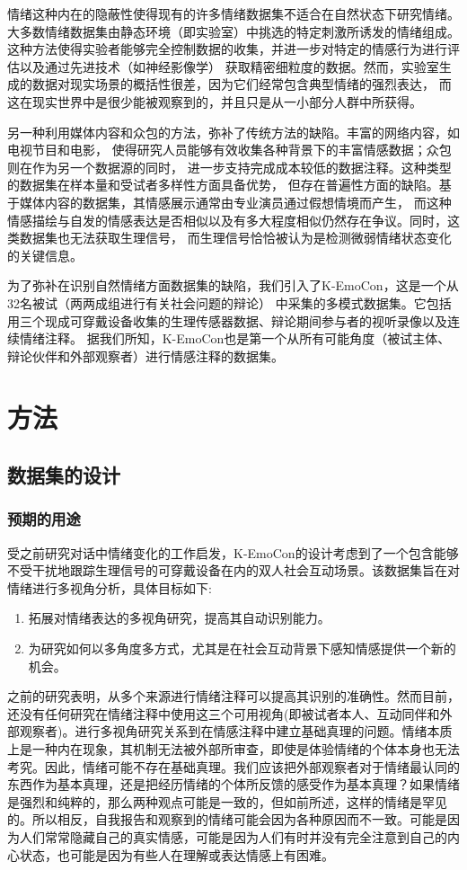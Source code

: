情绪这种内在的隐蔽性使得现有的许多情绪数据集不适合在自然状态下研究情绪。
大多数情绪数据集由静态环境（即实验室）中挑选的特定刺激所诱发的情绪组成。
这种方法使得实验者能够完全控制数据的收集，并进一步对特定的情感行为进行评估以及通过先进技术（如神经影像学）
获取精密细粒度的数据。然而，实验室生成的数据对现实场景的概括性很差，因为它们经常包含典型情绪的强烈表达，
而这在现实世界中是很少能被观察到的，并且只是从一小部分人群中所获得。

另一种利用媒体内容和众包的方法，弥补了传统方法的缺陷。丰富的网络内容，如电视节目和电影，
使得研究人员能够有效收集各种背景下的丰富情感数据；众包则在作为另一个数据源的同时，
进一步支持完成成本较低的数据注释。这种类型的数据集在样本量和受试者多样性方面具备优势，
但存在普遍性方面的缺陷。基于媒体内容的数据集，其情感展示通常由专业演员通过假想情境而产生，
而这种情感描绘与自发的情感表达是否相似以及有多大程度相似仍然存在争议。同时，这类数据集也无法获取生理信号，
而生理信号恰恰被认为是检测微弱情绪状态变化的关键信息。

为了弥补在识别自然情绪方面数据集的缺陷，我们引入了K-EmoCon，这是一个从32名被试（两两成组进行有关社会问题的辩论）
中采集的多模式数据集。它包括用三个现成可穿戴设备收集的生理传感器数据、辩论期间参与者的视听录像以及连续情绪注释。
据我们所知，K-EmoCon也是第一个从所有可能角度（被试主体、辩论伙伴和外部观察者）进行情感注释的数据集。

\section{方法}
\subsection{数据集的设计}
\subsubsection{预期的用途}
受之前研究对话中情绪变化的工作启发，K-EmoCon的设计考虑到了一个包含能够不受干扰地跟踪生理信号的可穿戴设备在内的双人社会互动场景。该数据集旨在对情绪进行多视角分析，具体目标如下:
\begin{enumerate}
    \item 拓展对情绪表达的多视角研究，提高其自动识别能力。
    \item 为研究如何以多角度多方式，尤其是在社会互动背景下感知情感提供一个新的机会。
    \end{enumerate}

之前的研究表明，从多个来源进行情绪注释可以提高其识别的准确性。然而目前，还没有任何研究在情绪注释中使用这三个可用视角(即被试者本人、互动同伴和外部观察者)。进行多视角研究关系到在情感注释中建立基础真理的问题。情绪本质上是一种内在现象，其机制无法被外部所审查，即使是体验情绪的个体本身也无法考究。因此，情绪可能不存在基础真理。我们应该把外部观察者对于情绪最认同的东西作为基本真理，还是把经历情绪的个体所反馈的感受作为基本真理？如果情绪是强烈和纯粹的，那么两种观点可能是一致的，但如前所述，这样的情绪是罕见的。所以相反，自我报告和观察到的情绪可能会因为各种原因而不一致。可能是因为人们常常隐藏自己的真实情感，可能是因为人们有时并没有完全注意到自己的内心状态，也可能是因为有些人在理解或表达情感上有困难。

